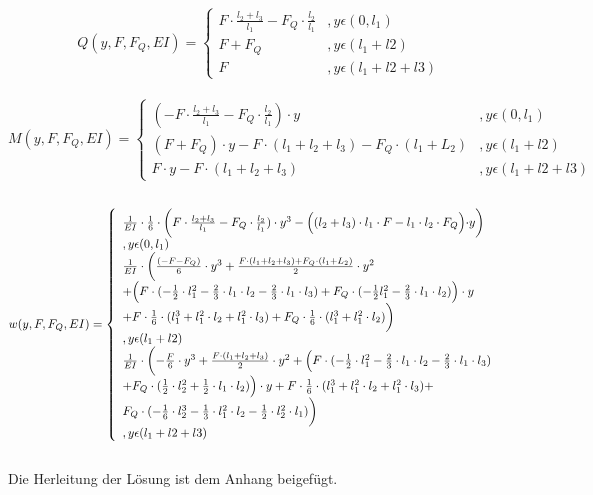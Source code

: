 \begin{equation}
	Q(y,F,F_{Q},EI)=\left\{\begin{array}{ll}
		F\cdot \frac{l_{2}+l_{3}}{l_{1}}-F_{Q}\cdot \frac{l_{2}}{l_{1}}&,y\epsilon (0,l_{1})\\
		F+F_{Q}&,y\epsilon (l_{1}+l{2})\\
		F&,y\epsilon (l_{1}+l{2}+l{3})
	\end{array}\right.
\end{equation}\\
\begin{equation}
	M(y,F,F_{Q},EI)=\left\{\begin{array}{ll}
		(-F\cdot \frac{l_{2}+l_{3}}{l_{1}}-F_{Q}\cdot \frac{l_{2}}{l_{1}})\cdot y&,y\epsilon (0,l_{1})\\
		(F+F_{Q})\cdot y - F\cdot (l_{1}+l_{2}+l_{3})-F_{Q}\cdot (l_{1}+L_{2})&,y\epsilon (l_{1}+l{2})\\
		F\cdot y - F\cdot (l_{1}+l_{2}+l_{3})&,y\epsilon (l_{1}+l{2}+l{3})
	\end{array}\right.
\end{equation}\\
\begin{equation}
	w(y,F,F_{Q},EI)=\left\{\begin{array}{ll}
		\frac{1}{EI}\cdot\frac{1}{6}\cdot\biggl(F\cdot \frac{l_{2}+l_{3}}{l_{1}}-F_{Q}\cdot \frac{l_{2}}{l_{1}})\cdot y^{3}-\Bigl((l_{2}+l_{3})\cdot l_{1}\cdot F-l_{1}\cdot l_{2}\cdot F_{Q}\Bigl)\cdot y \biggr)&\\,y\epsilon (0,l_{1})\\
		\frac{1}{EI}\cdot\biggl(\frac{(-F-F_{Q})}{6}\cdot y^{3} + \frac{F\cdot (l_{1}+l_{2}+l_{3})+F_{Q}\cdot (l_{1}+L_{2})}{2}\cdot y^{2}\\ + \Bigl(F\cdot(-\frac{1}{2}\cdot l_{1}^{2}-\frac{2}{3}\cdot l_{1}\cdot l_{2}-\frac{2}{3}\cdot l_{1}\cdot l_{3})+ F_{Q}\cdot(-\frac{1}{2}l_{1}^{2}-\frac{2}{3}\cdot l_{1}\cdot l_{2})\Bigr)\cdot y \\+ F\cdot\frac{1}{6}\cdot(l_{1}^{3}+l_{1}^{2}\cdot l_{2}+l_{1}^{2}\cdot l_{3}) + F_{Q}\cdot\frac{1}{6}\cdot(l_{1}^{3}+l_{1}^{2}\cdot l_{2})\biggr)&\\,y\epsilon (l_{1}+l{2})\\
		\frac{1}{EI}\cdot\biggl(-\frac{F}{6}\cdot y^{3} + \frac{ F\cdot (l_{1}+l_{2}+l_{3})}{2}\cdot y^{2} + \Bigl(F\cdot(-\frac{1}{2}\cdot l_{1}^{2} -\frac{2}{3}\cdot l_{1}\cdot l_{2}-\frac{2}{3}\cdot l_{1}\cdot l_{3})\\ + F_{Q}\cdot(\frac{1}{2}\cdot l_{2}^{2}+\frac{1}{2}\cdot l_{1}\cdot l_{2})\Bigr)\cdot y +F\cdot\frac{1}{6}\cdot(l_{1}^{3}+l_{1}^{2}\cdot l_{2}+l_{1}^{2}\cdot l_{3}) + \\F_{Q}\cdot(-\frac{1}{6}\cdot l_{2}^{3}-\frac{1}{3}\cdot l_{1}^{2}\cdot l_{2}-\frac{1}{2}\cdot l_{2}^{2}\cdot l_{1})\biggr)&\\,y\epsilon (l_{1}+l{2}+l{3})
	\end{array}\right.
\end{equation}\\
Die Herleitung der Lösung ist dem Anhang beigefügt.

